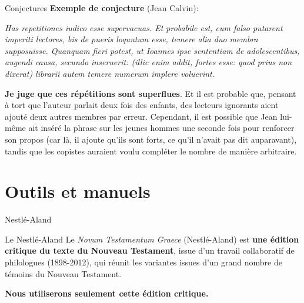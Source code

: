 \documentclass[11pt]{beamer}
\begin{document}
\begin{frame}{Conjectures}
    \textbf{Exemple de conjecture} (Jean Calvin):\\
    \pause
    
    \begin{minipage}{.4\textwidth}
    \footnotesize
    \begin{exampleblock}{}
    \textit{Has repetitiones iudico esse supervacuas. Et probabile est, cum falso putarent imperiti lectores, bis de pueris loquutum esse, temere alia duo membra supposuisse. Quanquam fieri potest, ut Ioannes ipse sententiam de adolescentibus, augendi causa, secundo inseruerit: (illic enim addit, fortes esse: quod prius non dixerat) librarii autem temere numerum implere voluerint.}
    \end{exampleblock}
    \end{minipage}%
    \hfill
    \begin{minipage}{.4\textwidth}
    \footnotesize
    \textbf{Je juge que ces répétitions sont superflues}. Et il est probable que, pensant à tort que l’auteur parlait deux fois des enfants, des lecteurs ignorants aient ajouté deux autres membres par erreur. Cependant, il est possible que Jean lui-même ait inséré la phrase sur les jeunes hommes une seconde fois pour renforcer son propos (car là, il ajoute qu'ils sont forts, ce qu'il n'avait pas dit auparavant), tandis que les copistes auraient voulu compléter le nombre de manière arbitraire.
    \end{minipage}
\end{frame}



\section{Outils et manuels}

\begin{frame}{Nestlé-Aland}
    \begin{block}{Le Nestlé-Aland}
    Le \textit{Novum Testamentum Graece} (Nestlé-Aland) est \textbf{une édition critique du texte du Nouveau Testament}, issue d'un travail collaboratif de philologues (1898-2012), qui réunit les variantes issues d'un grand nombre de témoins du Nouveau Testament.
    \end{block} 

    \textbf{Nous utiliserons seulement cette édition critique.}
\end{frame}
\end{document}
